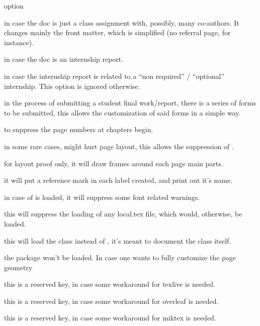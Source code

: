 \documentclass[article,nogeometry,english,tocdepth=3,secdepth=3]{ufrgscca} %
\begin{document}
\begin{describelist}{option}

	 { in case the doc is just a class assignment with, possibly, many co-authors. It changes mainly the front matter, which is simplified (no referral page, for instance).}

	 { in case the doc is an internship report.}

	 { in case the internship report is related to a “non required” / “optional” internship. This option is ignored otherwise.}

	 { in the process of submitting a student final work/report, there is a series of forms to be submitted, this allows the customization  of said forms in a simple  way.}

	 { to suppress the page numbers at chapters begin.}

	 { in some rare cases,  might hurt page layout, this allows the suppression of .}

	 { for layout proof only, it will draw frames around each page main parts.}

	 { it will put a reference mark in each label created, and print out it's name.}

	 { in case of  is loaded, it will suppress some font related warnings.}

	 { this will suppress the loading of any local.tex file, which would, otherwise, be loaded.}

	 { this will load the  class   instead of , it's meant to document the class itself.}

	 { the package  won't be loaded. In case one wants to fully customize the page geometry}

	 { this is a reserved key, in case some workaround for texlive is needed.}

	 { this is a reserved key, in case some workaround for overleaf is needed.}

	 { this is a reserved key, in case some workaround for miktex is needed.}
\end{describelist}
\end{document}
